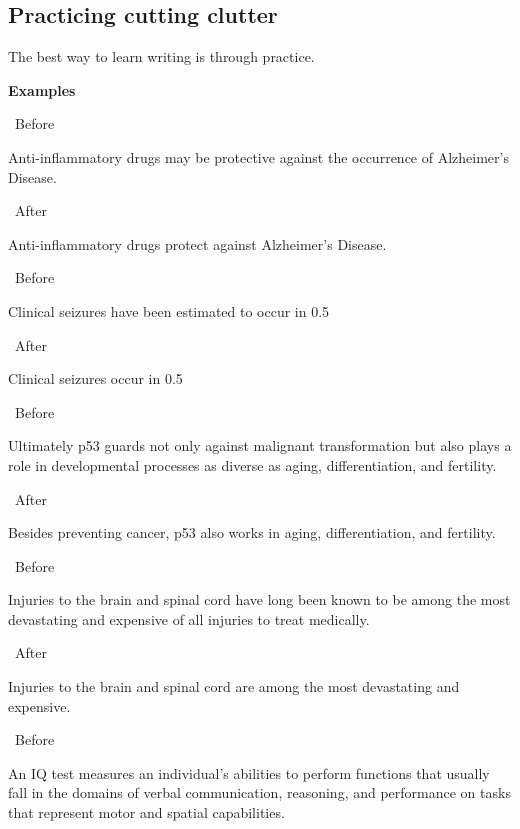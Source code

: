 \documentclass[a4paper, 12pt]{article}
\begin{document}
\newpage\subsection{Practicing cutting clutter}

The best way to learn writing is through practice.

\par\textbf{Examples}

\par\textbullet\ Before
\par Anti-inflammatory drugs may be protective against the occurrence of Alzheimer’s Disease.

\par\textbullet\ After
\par Anti-inflammatory drugs protect against Alzheimer’s Disease.

\par\textbullet\ Before
\par Clinical seizures have been estimated to occur in 0.5%

\par\textbullet\ After
\par Clinical seizures occur in 0.5%

\par\textbullet\ Before
\par Ultimately p53 guards not only against malignant transformation but also plays a role in developmental processes as diverse as aging, differentiation, and fertility.

\par\textbullet\ After
\par Besides preventing cancer, p53 also works in aging, differentiation, and fertility.

\par\textbullet\ Before
\par Injuries to the brain and spinal cord have long been known to be among the most devastating and expensive of all injuries to treat medically.

\par\textbullet\ After
\par Injuries to the brain and spinal cord are among the most devastating and expensive.

\par\textbullet\ Before
\par An IQ test measures an individual’s abilities to perform functions that usually fall in the domains of verbal communication, reasoning, and performance on tasks that represent motor and spatial capabilities.
\end{document}
